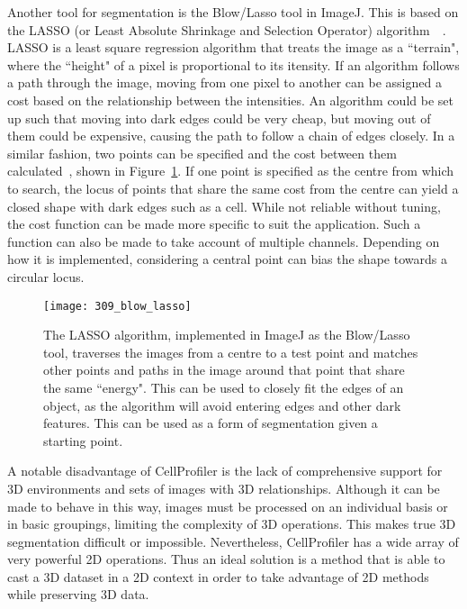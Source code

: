 Another tool for segmentation is the Blow/Lasso tool in ImageJ. This is based on the LASSO (or Least Absolute Shrinkage and Selection Operator) algorithm~\cite{Tibshirani:11}~\cite{Wang:07}. LASSO is a least square regression algorithm that treats the image as a ``terrain", where the ``height" of a pixel is proportional to its itensity. If an algorithm follows a path through the image, moving from one pixel to another can be assigned a cost based on the relationship between the intensities. An algorithm could be set up such that moving into dark edges could be very cheap, but moving out of them could be expensive, causing the path to follow a chain of edges closely. In a similar fashion, two points can be specified and the cost between them calculated~\cite{Tibshirani:11}, shown in Figure~\ref{fig:blow}. If one point is specified as the centre from which to search, the locus of points that share the same cost from the centre can yield a closed shape with dark edges such as a cell. While not reliable without tuning, the cost function can be made more specific to suit the application. Such a function can also be made to take account of multiple channels. Depending on how it is implemented, considering a central point can bias the shape towards a circular locus.

\begin{figure}[h!]
 \centering
 \texttt{[image: 309\_blow\_lasso]}
 \caption[The LASSO tool]{
 	The LASSO algorithm, implemented in ImageJ as the Blow/Lasso tool, traverses the images from a centre to a test point and matches other points and paths in the image around that point that share the same ``energy". This can be used to closely fit the edges of an object, as the algorithm will avoid entering edges and other dark features. This can be used as a form of segmentation given a starting point.
 }
 \label{fig:blow}
\end{figure}

A notable disadvantage of CellProfiler is the lack of comprehensive support for 3D environments and sets of images with 3D relationships. Although it can be made to behave in this way, images must be processed on an individual basis or in basic groupings, limiting the complexity of 3D operations. This makes true 3D segmentation difficult or impossible. Nevertheless, CellProfiler has a wide array of very powerful 2D operations. Thus an ideal solution is a method that is able to cast a 3D dataset in a 2D context in order to take advantage of 2D methods while preserving 3D data.


